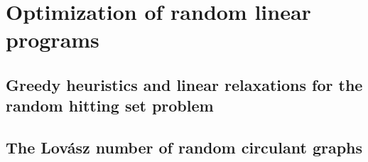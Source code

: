 \chapter{Optimization of random linear programs}
\section[Greedy heuristics]{Greedy heuristics and linear relaxations for the random hitting set problem}

\section[Lovasz number]{The Lovász number of random circulant graphs}




